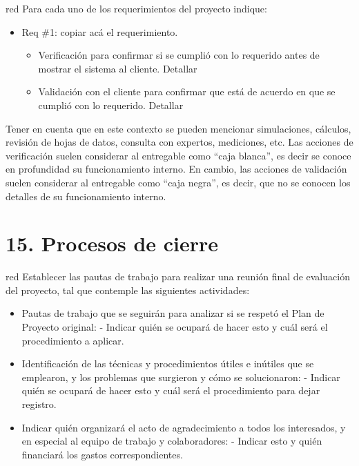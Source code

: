 \documentclass[
11pt, %
codirector, %
]{charter}
\begin{document}
\begin{consigna}{red}
Para cada uno de los requerimientos del proyecto indique:
\begin{itemize} 
\item Req \#1: copiar acá el requerimiento.

\begin{itemize}
	\item Verificación para confirmar si se cumplió con lo requerido antes de mostrar el sistema al cliente. Detallar 
	\item Validación con el cliente para confirmar que está de acuerdo en que se cumplió con lo requerido. Detallar  
\end{itemize}

\end{itemize}

Tener en cuenta que en este contexto se pueden mencionar simulaciones, cálculos, revisión de hojas de datos, consulta con expertos, mediciones, etc.  Las acciones de verificación suelen considerar al entregable como ``caja blanca'', es decir se conoce en profundidad su funcionamiento interno.  En cambio, las acciones de validación suelen considerar al entregable como ``caja negra'', es decir, que no se conocen los detalles de su funcionamiento interno.

\end{consigna}

\section{15. Procesos de cierre}    
\label{sec:cierre}

\begin{consigna}{red}
Establecer las pautas de trabajo para realizar una reunión final de evaluación del proyecto, tal que contemple las siguientes actividades:

\begin{itemize}
	\item Pautas de trabajo que se seguirán para analizar si se respetó el Plan de Proyecto original:
	 - Indicar quién se ocupará de hacer esto y cuál será el procedimiento a aplicar. 
	\item Identificación de las técnicas y procedimientos útiles e inútiles que se emplearon, y los problemas que surgieron y cómo se solucionaron:
	 - Indicar quién se ocupará de hacer esto y cuál será el procedimiento para dejar registro.
	\item Indicar quién organizará el acto de agradecimiento a todos los interesados, y en especial al equipo de trabajo y colaboradores:
	  - Indicar esto y quién financiará los gastos correspondientes.
\end{itemize}

\end{consigna}
\end{document}
